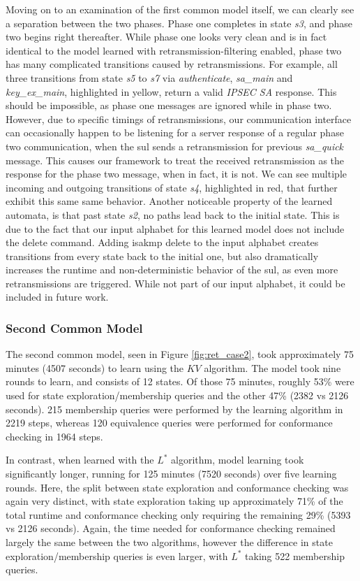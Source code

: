 Moving on to an examination of the first common model itself, we can clearly see a separation between the two phases. Phase one completes in state \emph{s3}, and phase two begins right thereafter. While phase one looks very clean and is in fact identical to the model learned with retransmission-filtering enabled, phase two has many complicated transitions caused by retransmissions. For example, all three transitions from state \emph{s5} to \emph{s7} via \emph{authenticate}, \emph{sa\_main} and \emph{key\_ex\_main}, highlighted in yellow, return a valid \emph{IPSEC SA} response. This should be impossible, as phase one messages are ignored while in phase two. However, due to specific timings of retransmissions, our communication interface can occasionally happen to be listening for a server response of a regular phase two communication, when the \ac{sul} sends a retransmission for previous \emph{sa\_quick} message. This causes our framework to treat the received retransmission as the response for the phase two message, when in fact, it is not. We can see multiple incoming and outgoing transitions of state \emph{s4}, highlighted in red, that further exhibit this same same behavior.
Another noticeable property of the learned automata, is that past state \emph{s2}, no paths lead back to the initial state. This is due to the fact that our input alphabet for this learned model does not include the delete command. Adding \ac{isakmp} delete to the input alphabet creates transitions from every state back to the initial one, but also dramatically increases the runtime and non-deterministic behavior of the \ac{sul}, as even more retransmissions are triggered. While not part of our input alphabet, it could be included in future work.


\subsubsection*{Second Common Model}

The second common model, seen in Figure \ref{fig:ret_case2}, took approximately 75 minutes (4507 seconds) to learn using the $KV$ algorithm. The model took nine rounds to learn, and consists of 12 states. Of those 75 minutes, roughly 53\% were used for state exploration/membership queries and the other 47\% (2382 vs 2126 seconds). 215 membership queries were performed by the learning algorithm in 2219 steps, whereas 120 equivalence queries were performed for conformance checking in 1964 steps. 

In contrast, when learned with the $L^*$ algorithm, model learning took significantly longer, running for 125 minutes (7520 seconds) over five learning rounds. Here, the split between state exploration and conformance checking was again very distinct, with state exploration taking up approximately 71\% of the total runtime and conformance checking only requiring the remaining 29\% (5393 vs 2126 seconds). Again, the time needed for conformance checking remained largely the same between the two algorithms, however the difference in state exploration/membership queries is even larger, with $L^*$ taking 522 membership queries.

